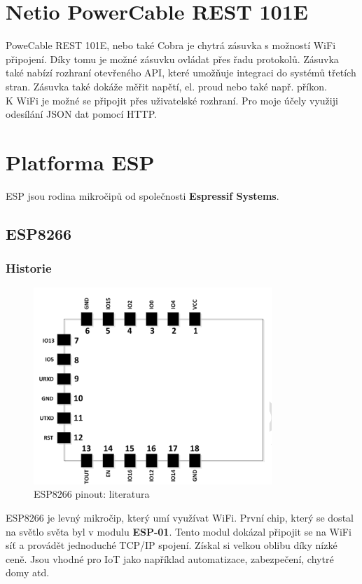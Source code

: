 \documentclass[a4paper, 12pt]{report}
\begin{document}
    \section{Netio PowerCable REST 101E}\label{sec:netio-powercable-rest-101e}
    PoweCable REST 101E, nebo také Cobra je chytrá zásuvka s možností WiFi připojení.
    Díky tomu je možné zásuvku ovládat přes řadu protokolů.
    Zásuvka také nabízí rozhraní otevřeného API, které umožňuje integraci do systémů třetích stran.
    Zásuvka také dokáže měřit napětí, el. proud nebo také např. příkon. \\
    K WiFi je možné se připojit přes uživatelské rozhraní.
    Pro moje účely využiji odesílání JSON dat pomocí HTTP\@.


    \section{Platforma ESP}\label{sec:platforma-esp}
    ESP jsou rodina mikročipů od společnosti \textbf{Espressif Systems}.

    \subsection{ESP8266}\label{subsec:esp8266}

    \subsubsection{Historie}
    \begin{figure}[h!]
        \centering
        \includegraphics[width=9cm]{images/ESP8266_piny}
        \caption{ESP8266 pinout: literatura~\cite{WT8266}}
        \label{fig:esp8266_piny}
    \end{figure}
    ESP8266 je levný mikročip, který umí využívat WiFi. První chip, který se dostal na světlo světa byl v modulu \textbf{ESP-01}.
    Tento modul dokázal připojit se na WiFi síť a provádět jednoduché TCP/IP spojení. Získal si velkou oblibu díky nízké ceně.
    Jsou vhodné pro IoT jako například automatizace, zabezpečení, chytré domy atd.
\end{document}
